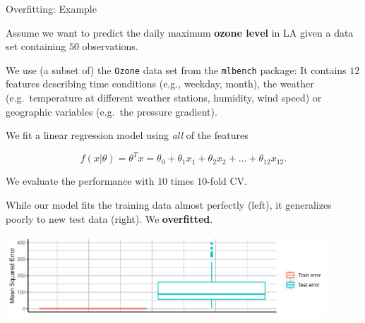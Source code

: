 \begin{vbframe}{Overfitting: Example}

Assume we want to predict the daily maximum \textbf{ozone level} in LA
given a data set containing \(50\) observations.

\vfill

We use (a subset of) the \texttt{Ozone} data set from the \texttt{mlbench} package:
It contains \(12\) features describing time conditions (e.g., weekday, month), the weather (e.g.~temperature at different weather stations, humidity, wind speed) or geographic variables (e.g.~the pressure gradient).

\framebreak

We fit a linear regression model using \emph{all} of the features

\[
f(x | \theta) = \theta^Tx = \theta_0 + \theta_1 x_1 + \theta_2 x_2 + ... + \theta_{12} x_{12}.
\]

We evaluate the performance with \(10\) times \(10\)-fold CV.

\vfill

While our model fits the training data almost perfectly (left), it generalizes poorly to new test data (right). We \textbf{overfitted}.

\begin{center}
\includegraphics[width=0.9\textwidth]{plots/regularization.png}
\end{center}

\end{vbframe}


